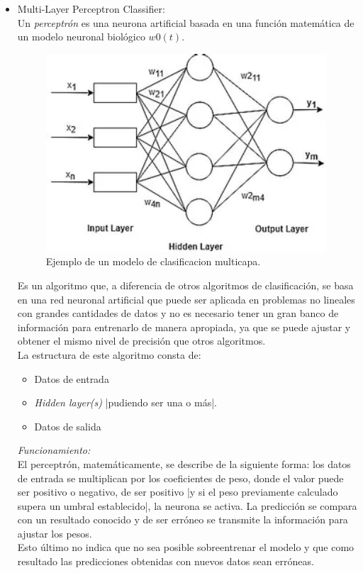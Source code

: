 \documentclass[spanish,12pt,letterpaper]{article}
\begin{document}
\begin{itemize}
    \item Multi-Layer Perceptron Classifier:\\
    Un \textit{perceptrón} es una neurona artificial basada en una función matemática de un modelo neuronal biológico $w0(t)$.  \begin{figure}[H]
        \centering
        \includegraphics[width=0.8\columnwidth]{classifier1.png}
        \caption{Ejemplo de un modelo de clasificacion multicapa.}
        \label{fig:comand}%
    \end{figure}
    Es un algoritmo que, a diferencia de otros algoritmos de clasificación, se basa en una red neuronal artificial que puede ser aplicada en problemas no lineales con grandes cantidades de datos y no es necesario tener un gran banco de información para entrenarlo de manera apropiada, ya que se puede ajustar y obtener el mismo nivel de precisión que otros algoritmos.\\
    La estructura de este algoritmo consta de:
    \begin{itemize}
        \item Datos de entrada
        \item \textit{Hidden layer(s)} |pudiendo ser una o más|.
        \item Datos de salida
    \end{itemize}
    \newpage
    \textit{Funcionamiento:}\\
    El perceptrón, matemáticamente, se describe de la siguiente forma: los datos de entrada se multiplican por los coeficientes de peso, donde el valor puede ser positivo o negativo, de ser positivo |y si el peso previamente calculado supera un umbral establecido|,  la neurona se activa. La predicción se compara con un resultado conocido y de ser erróneo se transmite la información para ajustar los pesos.\\ 
    Esto último no indica que no sea posible sobreentrenar el modelo y que como resultado las predicciones obtenidas con nuevos datos sean erróneas. 
    
    
\end{itemize}
\end{document}
